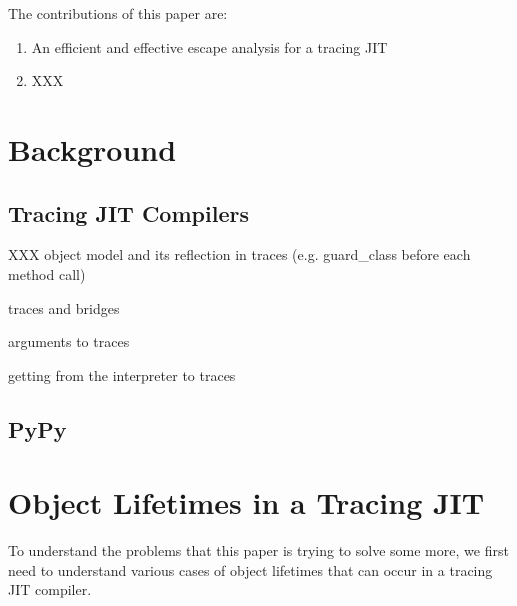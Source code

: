 \documentclass{sigplanconf}
\begin{document}
The contributions of this paper are:

\begin{enumerate}
    \item An efficient and effective escape analysis for a tracing JIT
    \item XXX
\end{enumerate}

\section{Background}
\label{sec:Background}

\subsection{Tracing JIT Compilers}
\label{sub:JIT_background}

XXX object model and its reflection in traces (e.g. guard\_class before each method call)

traces and bridges

arguments to traces

getting from the interpreter to traces

\subsection{PyPy}
\label{sub:PyPy}

\section{Object Lifetimes in a Tracing JIT}
\label{sec:lifetimes}


To understand the problems that this paper is trying to solve some more, we
first need to understand various cases of object lifetimes that can occur in a
tracing JIT compiler.
\end{document}
